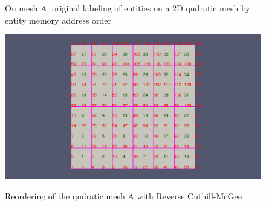 \documentclass{article}
\begin{document}
\begin{figure}[ht]
\caption{On mesh A: original labeling of entities on a 2D qudratic mesh by entity memory address order}
\centering
\end{figure}

\begin{figure}[h]
\caption{Reordering of the qudratic mesh A with Reverse Cuthill-McGee}
{\includegraphics[width = 15cm ]{post_a}}
\centering
\end{figure}
\end{document}

